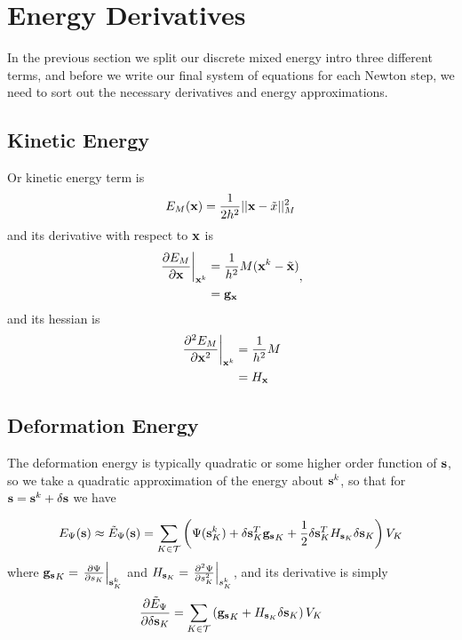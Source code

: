 
\section{Energy Derivatives}

In the previous section we split our discrete mixed energy intro three different terms, and before we write our final system of equations for each Newton step, we need to sort out the necessary derivatives and energy approximations.

\subsection{Kinetic Energy}
Or kinetic energy term is
\begin{align}
E_M (\mathbf{x}) &= \frac{1}{2h^2} ||\mathbf{x} - \tilde{x}||_M^2 \\
\end{align}
and its derivative with respect to $\mathbf{x}$ is
\begin{equation}
\begin{split}
\left. \frac{\partial E_M }{\partial \mathbf{x}} \right|_{\mathbf{x}^k} &= \frac{1}{h^2}M(\mathbf{x}^k - \tilde{\mathbf{x}}) \\
&=  {\mathbf{g}_{\mathbf{x}}}
\end{split},
\end{equation}
and its hessian is
\begin{equation}
\begin{split}
\left. \frac{\partial^2 E_M }{\partial \mathbf{x}^2} \right|_{\mathbf{x}^k} &= \frac{1}{h^2}M \\
&=  {H_{\mathbf{x}}}
\end{split}
\end{equation}

\subsection{Deformation Energy}
The deformation energy is typically quadratic or some higher order function of $\mathbf{s}$, so we take a quadratic approximation of the energy about $\mathbf{s}^k$, so that for $\mathbf{s}=\mathbf{s}^k + \delta \mathbf{s}$ we have

\begin{equation}
E_\Psi (\mathbf{s}) \approx \tilde{E}_\Psi (\mathbf{s}) = \sum_{K \in \mathcal{T}} \left(\Psi(\mathbf{s}_K^k) + \delta \mathbf{s}_K^T {\mathbf{g}_{\mathbf{s}}}_K + \frac{1}{2}\delta \mathbf{s}_K^T {H_{\mathbf{s}_K}} \delta \mathbf{s}_K \right) V_K
\end{equation}
where 
${\mathbf{g}_{\mathbf{s}}}_K =\left.\frac{\partial \Psi}{\partial s_K}\right|_{\mathbf{s}_K^k}$ and
${H_{\mathbf{s}_K}}=\left.\frac{\partial^2 \Psi}{\partial s_K^2}\right|_{s_K^k}$, and its derivative is simply
\begin{equation}
\frac{\partial \tilde{E}_\Psi}{\partial \delta \mathbf{s}_K} =
\sum_{K \in \mathcal{T}} \left({\mathbf{g}_{\mathbf{s}}}_K + {H_{\mathbf{s}_K}} \delta \mathbf{s}_K \right) V_K
\end{equation}

